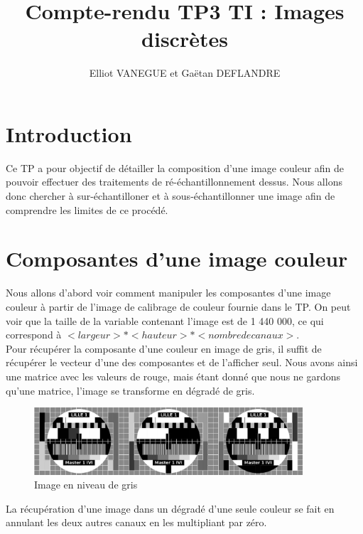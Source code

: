 \documentclass[a4paper,11pt]{article}
\title{Compte-rendu TP3 TI : Images discrètes}
\author{Elliot VANEGUE et Gaëtan DEFLANDRE}
\begin{document}


  \maketitle
  
  \mbox{}
  \newpage
  \clearpage
  
  \section*{Introduction}
  Ce TP a pour objectif de détailler la composition d'une image couleur afin de pouvoir 
  effectuer des traitements de ré-échantillonnement dessus. Nous allons donc chercher à sur-échantilloner et à 
  sous-échantillonner une image afin de comprendre les limites de ce procédé.
  
  \section{Composantes d'une image couleur}
  Nous allons d'abord voir comment manipuler les composantes d'une image couleur à partir de l'image de calibrage
  de couleur fournie dans le TP. On peut voir que la taille de la variable contenant l'image est de 1 440 000,
  ce qui correspond à $<largeur> * <hauteur> * <nombre de canaux>$.\\
  
  Pour récupérer la composante d'une couleur en image de gris, il suffit de récupérer le vecteur d'une des composantes
  et de l'afficher seul. Nous avons ainsi une matrice avec les valeurs de rouge, mais étant donné que nous ne gardons qu'une matrice,
  l'image se transforme en dégradé de gris.\\
  
  \begin{figure}[H]
    \center
    \includegraphics[width=10cm]{../mire_gris.png}
    \caption{Image en niveau de gris}
  \end{figure}
  
  La récupération d'une image dans un dégradé d'une seule couleur se fait en annulant les deux autres canaux en les multipliant par
  zéro.
  
\end{document}
